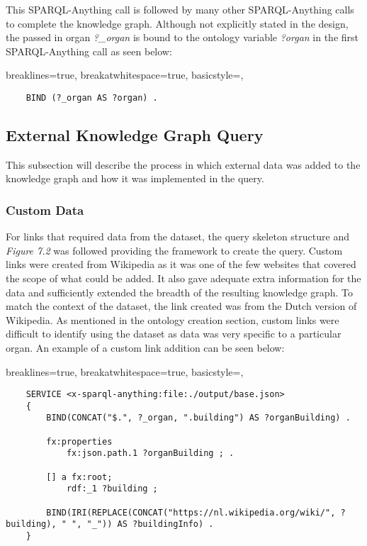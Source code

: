 This SPARQL-Anything call is followed by many other SPARQL-Anything calls to complete the knowledge graph. Although not explicitly stated in the design, the passed in organ \textit{?\_organ} is bound to the ontology variable \textit{?organ} in the first SPARQL-Anything call as seen below:

\lstset
{
    breaklines=true,
    breakatwhitespace=true,
    basicstyle=\ttfamily,
}
\begin{lstlisting}
    BIND (?_organ AS ?organ) .
\end{lstlisting}

\subsection{External Knowledge Graph Query}
\hspace*{0.5cm} This subsection will describe the process in which external data was added to the knowledge graph and how it was implemented in the query. 

\subsubsection{Custom Data}
\hspace*{0.5cm} For links that required data from the dataset, the query skeleton structure and \textit{Figure 7.2} was followed providing the framework to create the query. Custom links were created from Wikipedia as it was one of the few websites that covered the scope of what could be added. It also gave adequate extra information for the data and sufficiently extended the breadth of the resulting knowledge graph. To match the context of the dataset, the link created was from the Dutch version of Wikipedia. As mentioned in the ontology creation section, custom links were difficult to identify using the dataset as data was very specific to a particular organ. An example of a custom link addition can be seen below:

\lstset
{
    breaklines=true,
    breakatwhitespace=true,
    basicstyle=\ttfamily,
}
\begin{lstlisting}
    SERVICE <x-sparql-anything:file:./output/base.json>
    {
        BIND(CONCAT("$.", ?_organ, ".building") AS ?organBuilding) .
    
        fx:properties
            fx:json.path.1 ?organBuilding ; .
    
        [] a fx:root; 
            rdf:_1 ?building ;
    
        BIND(IRI(REPLACE(CONCAT("https://nl.wikipedia.org/wiki/", ?building), " ", "_")) AS ?buildingInfo) . 
    } 
\end{lstlisting}

